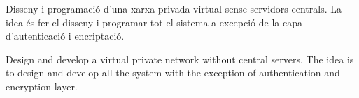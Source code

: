\portada

\begin{resum}{17cm}
Disseny i programació d'una xarxa privada virtual sense servidors centrals. La idea és fer el disseny i programar tot el sistema a excepció de la capa d'autenticació i encriptació.
\end{resum}

\begin{overview}{17cm}
Design and develop a virtual private network without central servers. The idea is to design and develop all the system with the exception of authentication and encryption layer.
\end{overview}


\thispagestyle{empty}
\tableofcontents

\vspace{5em}
\listoffigures

